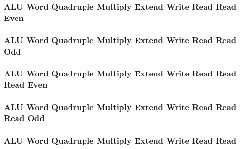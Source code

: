 

\subsubsection[{\small ALU Word Quadruple Multiply Extend Write Read Read Even}]{ALU Word Quadruple Multiply Extend Write Read Read Even} \label{sec:format-ALU-WQMEWRRE}



\subsubsection[{\small ALU Word Quadruple Multiply Extend Write Read Read Odd}]{ALU Word Quadruple Multiply Extend Write Read Read Odd} \label{sec:format-ALU-WQMEWRRO}



\subsubsection[{\small ALU Word Quadruple Multiply Extend Write Read Read Read Even}]{ALU Word Quadruple Multiply Extend Write Read Read Read Even} \label{sec:format-ALU-WQMEWRRRE}



\subsubsection[{\small ALU Word Quadruple Multiply Extend Write Read Read Read Odd}]{ALU Word Quadruple Multiply Extend Write Read Read Read Odd} \label{sec:format-ALU-WQMEWRRRO}



\subsubsection[{\small ALU Word Quadruple Multiply Extend Write Read Read}]{ALU Word Quadruple Multiply Extend Write Read Read} \label{sec:format-ALU-WQMXWRR}

